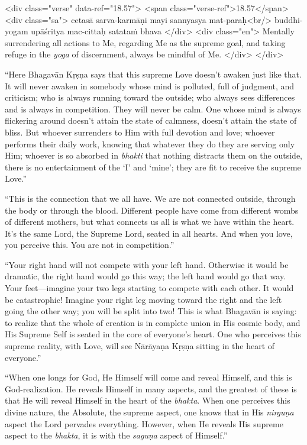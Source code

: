 \begin{html}
<div class="verse" data-ref="18.57">
  <span class="verse-ref">18.57</span>
  <div class="sa">
    cetasā sarva-karmāṇi mayi sannyasya mat-paraḥ<br/>
    buddhi-yogam upāśritya mac-cittaḥ satataṁ bhava
  </div>
  <div class="en">
    Mentally surrendering all actions to Me, regarding Me as the supreme goal, and taking refuge in the \textit{yoga} of discernment, always be mindful of Me.
  </div>
</div>
\end{html}


\enquote{Here Bhagavān Kṛṣṇa says that this supreme Love doesn’t awaken just like that. It will never awaken in somebody whose mind is polluted, full of judgment, and criticism; who is always running toward the outside; who always sees differences and is always in competition. They will never be calm. One whose mind is always flickering around doesn’t attain the state of calmness, doesn’t attain the state of bliss. But whoever surrenders to Him with full devotion and love; whoever performs their daily work, knowing that whatever they do they are serving only Him; whoever is so absorbed in \textit{bhakti} that nothing distracts them on the outside, there is no entertainment of the \enquote{I} and \enquote{mine}; they are fit to receive the supreme Love.}

\enquote{This is the connection that we all have. We are not connected outside, through the body or through the blood. Different people have come from different wombs of different mothers, but what connects us all is what we have within the heart. It’s the same Lord, the Supreme Lord, seated in all hearts. And when you love, you perceive this. You are not in competition.}

\enquote{Your right hand will not compete with your left hand. Otherwise it would be dramatic, the right hand would go this way; the left hand would go that way. Your feet---imagine your two legs starting to compete with each other. It would be catastrophic! Imagine your right leg moving toward the right and the left going the other way; you will be split into two! This is what Bhagavān is saying: to realize that the whole of creation is in complete union in His cosmic body, and His Supreme Self is seated in the core of everyone’s heart. One who perceives this supreme reality, with Love, will see Nārāyaṇa Kṛṣṇa sitting in the heart of everyone.}

\enquote{When one longs for God, He Himself will come and reveal Himself, and this is God-realization. He reveals Himself in many aspects, and the greatest of these is that He will reveal Himself in the heart of the \textit{bhakta}. When one perceives this divine nature, the Absolute, the supreme aspect, one knows that in His \textit{nirguṇa} aspect the Lord pervades everything. However, when He reveals His supreme aspect to the \textit{bhakta}, it is with the \textit{saguṇa} aspect of Himself.}

